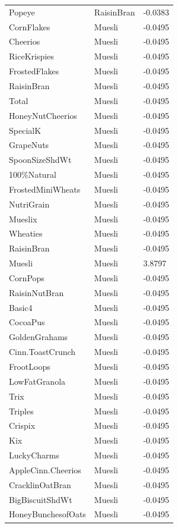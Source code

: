 \begin{table}[!htbp]
\begin{tabular}{lll}
\\
Popeye & RaisinBran & -0.0383
\\
CornFlakes & Muesli & -0.0495
\\
Cheerios & Muesli & -0.0495
\\
RiceKrispies & Muesli & -0.0495
\\
FrostedFlakes & Muesli & -0.0495
\\
RaisinBran & Muesli & -0.0495
\\
Total & Muesli & -0.0495
\\
HoneyNutCheerios & Muesli & -0.0495
\\
SpecialK & Muesli & -0.0495
\\
GrapeNuts & Muesli & -0.0495
\\
SpoonSizeShdWt & Muesli & -0.0495
\\
100\%Natural & Muesli & -0.0495
\\
FrostedMiniWheats & Muesli & -0.0495
\\
NutriGrain & Muesli & -0.0495
\\
Mueslix & Muesli & -0.0495
\\
Wheaties & Muesli & -0.0495
\\
RaisinBran & Muesli & -0.0495
\\
Muesli & Muesli & 3.8797
\\
CornPops & Muesli & -0.0495
\\
RaisinNutBran & Muesli & -0.0495
\\
Basic4 & Muesli & -0.0495
\\
CocoaPus & Muesli & -0.0495
\\
GoldenGrahams & Muesli & -0.0495
\\
Cinn.ToastCrunch & Muesli & -0.0495
\\
FrootLoops & Muesli & -0.0495
\\
LowFatGranola & Muesli & -0.0495
\\
Trix & Muesli & -0.0495
\\
Triples & Muesli & -0.0495
\\
Crispix & Muesli & -0.0495
\\
Kix & Muesli & -0.0495
\\
LuckyCharms & Muesli & -0.0495
\\
AppleCinn.Cheerios & Muesli & -0.0495
\\
CracklinOatBran & Muesli & -0.0495
\\
BigBiscuitShdWt & Muesli & -0.0495
\\
HoneyBunchesofOats & Muesli & -0.0495
\\

\end{tabular}
\end{table}
